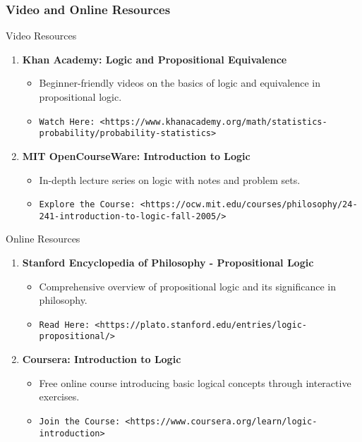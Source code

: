 \documentclass[aspectratio=169]{beamer}
\begin{document}
\begin{frame}[fragile]
  \frametitle{Video and Online Resources}
  \begin{block}{Video Resources}
    \begin{enumerate}
      \item \textbf{Khan Academy: Logic and Propositional Equivalence}
        \begin{itemize}
          \item Beginner-friendly videos on the basics of logic and equivalence in propositional logic. 
          \item \texttt{Watch Here: \textless https://www.khanacademy.org/math/statistics-probability/probability-statistics\textgreater}
        \end{itemize}

      \item \textbf{MIT OpenCourseWare: Introduction to Logic}
        \begin{itemize}
          \item In-depth lecture series on logic with notes and problem sets. 
          \item \texttt{Explore the Course: \textless https://ocw.mit.edu/courses/philosophy/24-241-introduction-to-logic-fall-2005/\textgreater}
        \end{itemize}
    \end{enumerate}
  \end{block}

  \begin{block}{Online Resources}
    \begin{enumerate}
      \item \textbf{Stanford Encyclopedia of Philosophy - Propositional Logic}
        \begin{itemize}
          \item Comprehensive overview of propositional logic and its significance in philosophy. 
          \item \texttt{Read Here: \textless https://plato.stanford.edu/entries/logic-propositional/\textgreater}
        \end{itemize}

      \item \textbf{Coursera: Introduction to Logic}
        \begin{itemize}
          \item Free online course introducing basic logical concepts through interactive exercises. 
          \item \texttt{Join the Course: \textless https://www.coursera.org/learn/logic-introduction\textgreater}
        \end{itemize}
    \end{enumerate}
  \end{block}
\end{frame}
\end{document}
